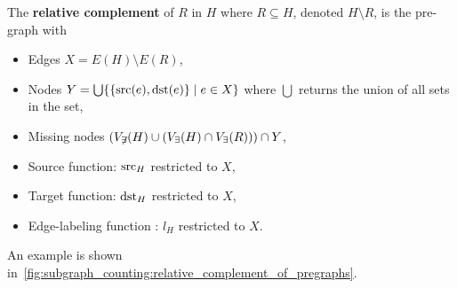 The \textbf{relative complement} of $R$ in $H$ where $R \subseteq H$, denoted $H \setminus R$, is the pre-graph with
\begin{itemize}
    \item Edges $X = E(H) \setminus E(R)$,
    \item Nodes $Y =  \bigcup \{\{\operatorname{src}(e), \operatorname{dst}(e)\} \mid e \in X \}$ where $\bigcup$ returns the union of all sets in the set,  
    \item Missing nodes $
   ( V_{\not \exists}(H)  \cup
        (
                  V_\exists(H) 
                  \cap 
                  V_\exists(R)
                  )
   )
        \cap  
        Y
                  $,
    \item Source function: ${\operatorname{src}_H}$ restricted to $X$,
    \item Target function: ${\operatorname{dst}_H}$ restricted to $X$,
    \item Edge-labeling function : $l_H$ restricted to $X$.
\end{itemize}
An example is shown in~\autoref{fig:subgraph_counting:relative_complement_of_pregraphs}.
